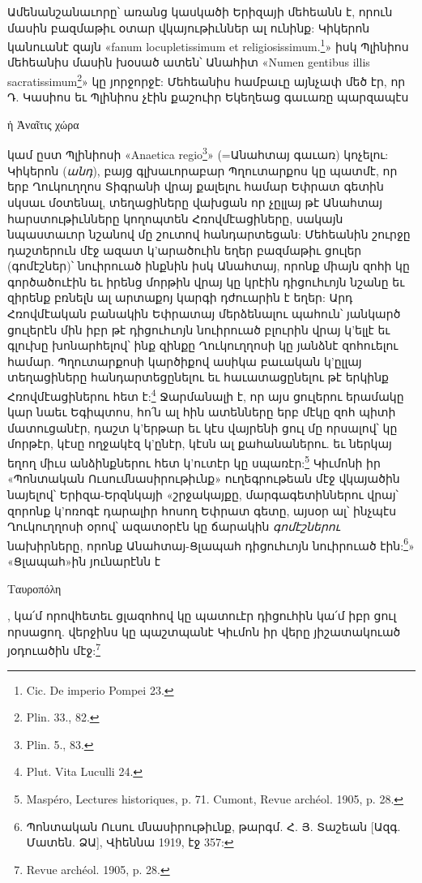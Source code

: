 \documentclass{article}
\begin{document}
{Ամենանշանաւորը՝ առանց կասկածի Երիզայի մեհեանն է, որուն մասին բազմաթիւ օտար վկայութիւններ ալ ունինք: Կիկերոն կանուանէ զայն «fanum locupletissimum et religiosissimum.\footnote{Cic. De imperio Pompei 23.}» իսկ Պլինիոս մեհեանիս մասին խօսած ատեն՝ Անահիտ «Numen gentibus illis sacratissimum\footnote{Plin. 33., 82.}» կը յորջորջէ: Մեհեանիս համբաւը այնչափ մեծ էր, որ Դ. Կասիոս եւ Պլինիոս չէին քաշուիր Եկեղեաց գաւառը պարզապէս \begin{greek}ἡ Ἀναῖτις χώρα\end{greek} կամ ըստ Պլինիոսի «Anaetica regio\footnote{Plin. 5., 83.}» (=Անահտայ գաւառ) կոչելու: Կիկերոն (\emph{անդ}), բայց գլխաւորաբար Պղուտարքոս կը պատմէ, որ երբ Ղուկուղղոս Տիգրանի վրայ քալելու համար Եփրատ գետին սկսաւ մօտենալ, տեղացիները վախցան որ չըլլայ թէ Անահտայ հարստութիւնները կողոպտեն Հռովմէացիները, սակայն նպաստաւոր նշանով մը շուտով հանդարտեցան: Մեհեանին շուրջը դաշտերուն մէջ ազատ կ'արածուին եղեր բազմաթիւ ցուլեր (գոմէշներ)՝ նուիրուած ինքնին իսկ Անահտայ, որոնք միայն զոհի կը գործածուէին եւ իրենց մորթին վրայ կը կրէին դիցուհւոյն նշանը եւ զիրենք բռնելն ալ արտաքոյ կարգի դժուարին է եղեր: Արդ Հռովմէական բանակին Եփրատայ մերձենալու պահուն՝ յանկարծ ցուլերէն մին իբր թէ դիցուհւոյն նուիրուած բլուրին վրայ կ'ելլէ եւ գլուխը խոնարհելով՝ ինք զինքը Ղուկուղղոսի կը յանձնէ զոհուելու համար. Պղուտարքոսի կարծիքով ասիկա բաւական կ'ըլլայ տեղացիները հանդարտեցընելու եւ հաւատացընելու թէ երկինք Հռովմէացիներու հետ է:\footnote{Plut. Vita Luculli 24.} Ջարմանալի է, որ այս ցուլերու երամակը կար նաեւ Եգիպտոս, հո՛ն ալ հին ատենները երբ մէկը զոհ պիտի մատուցանէր, դաշտ կ'երթար եւ կէս վայրենի ցուլ մը որսալով՝ կը մորթէր, կէսը ողջակէզ կ'ընէր, կէսն ալ քահանաներու. եւ ներկայ եղող միւս անձինքներու հետ կ'ուտէր կը սպառէր:\footnote{Maspéro, Lectures historiques, p. 71. Cumont, Revue archéol. 1905, p. 28.} Կիւմոնի իր «Պոնտական Ուսումնասիրութիւնք» ուղեգրութեան մէջ վկայածին նայելով՝ Երիզա-Երզնկայի «շրջակայքը, մարգագետիններու վրայ՝ զորոնք կ'ոռոգէ դարալիր հոսող Եփրատ գետը, այսօր ալ՝ ինչպէս Ղուկուղղոսի օրով՝ ազատօրէն կը ճարակին \emph{գոմէշներու} նախիրները, որոնք Անահտայ-Ցլապահ դիցուհւոյն նուիրուած էին:\footnote{Պոնտական Ուսու մնասիրութիւնք, թարգմ. Հ. Յ. Տաշեան [Ազգ. Մատեն. ՁԱ], Վիեննա 1919, էջ 357:}» «Ցլապահ»ին յունարէնն է \begin{greek}Ταυροπόλη\end{greek}, կա՛մ որովհետեւ ցլազոհով կը պատուէր դիցուհին կա՛մ իբր ցուլ որսացող. վերջինս կը պաշտպանէ Կիւմոն իր վերը յիշատակուած յօդուածին մէջ:\footnote{Revue archéol. 1905, p. 28.}

}
\end{document}
